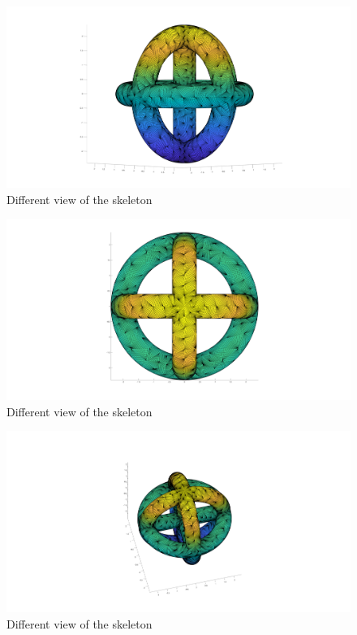 \documentclass[11pt, oneside]{article}   	%
\begin{document}
\begin{figure}[H]
\begin{center}
\includegraphics[width=6in]{sci_fi_2_skeleton_view_2.pdf}
\end{center}
\caption{Different view of the skeleton}
\label{sci_fi_2_skeleton_2}
\end{figure}

\begin{figure}[H]
\begin{center}
\includegraphics[width=6in]{sci_fi_2_skeleton_view_3.pdf}
\end{center}
\caption{Different view of the skeleton}
\label{sci_fi_2_skeleton_3}
\end{figure}

\begin{figure}[H]
\begin{center}
\includegraphics[width=6in]{sci_fi_2_skeleton_view_4.pdf}
\end{center}
\caption{Different view of the skeleton}
\label{sci_fi_2_skeleton_4}
\end{figure}
\end{document}
